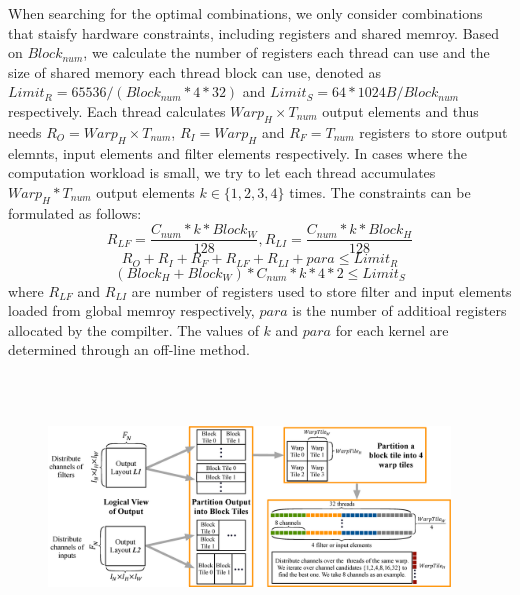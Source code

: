 When searching for the optimal combinations, we only consider combinations that staisfy hardware constraints, including registers and shared memroy.
Based on $Block_{num}$, we calculate the number of registers each thread can use and the size of shared memory each thread block can use, denoted as $Limit_R=65536/(Block_{num}*4*32)$ and $Limit_S=64*1024B/Block_{num}$ respectively.
Each thread calculates $Warp_H \times T_{num}$ output elements and thus needs $R_O=Warp_H \times T_{num}$, $R_I=Warp_H$ and $R_F=T_{num}$ registers to store output elemnts, input elements and filter elements respectively.
In cases where the computation workload is small, we try to let each thread accumulates $Warp_H*T_{num}$ output elements $k \in \{1,2,3,4\}$ times.
The constraints can be formulated as follows:
\begin{equation}\nonumber
R_{LF}=\frac{C_{num}*k*Block_W}{128},R_{LI}=\frac{C_{num}*k*Block_H}{128}
\end{equation}
\begin{equation}
    \label{fo:limitr}
R_O+R_I+R_F+R_{LF}+R_{LI}+para \leq Limit_R
\end{equation}
\begin{equation}
    \label{fo:limits}
(Block_H+Block_W)*C_{num}*k*4*2 \leq Limit_S
\end{equation}
where $R_{LF}$ and $R_{LI}$ are number of registers used to store filter and input elements loaded from global memroy respectively, $para$ is the number of additioal registers allocated by the compilter. The values of $k$ and $para$ for each kernel are determined through an off-line method. 
\begin{figure}
	\centering
    \includegraphics[width=0.95\textwidth,height=7cm]{./figure/pwworkflow1.eps}
    \caption{} \label{fig:pwworkflow}
\end{figure}
